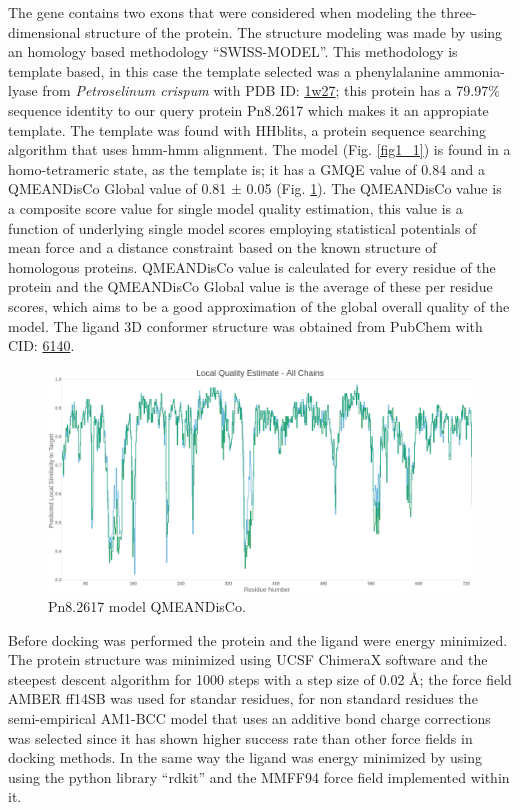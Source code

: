 \documentclass[12pt]{article}
\begin{document}
	The gene contains two exons that were considered when modeling the three-dimensional structure of the protein. The structure modeling was made by using an homology based methodology ``SWISS-MODEL''. \cite{swiss,quaternary_swiss} This methodology is template based, in this case the template selected was a phenylalanine ammonia-lyase from \textit{Petroselinum crispum} with PDB ID: \href{https://www.rcsb.org/structure/1w27}{1w27}; this protein has a 79.97\% sequence identity to our query protein Pn8.2617 which makes it an appropiate template. The template was found with HHblits, a protein sequence searching algorithm that uses hmm-hmm alignment. \cite{hhblits} The model (Fig. \ref{fig1_1}) is found in a homo-tetrameric state, as the template is; it has a GMQE value of 0.84 and a QMEANDisCo Global value of 0.81 ± 0.05 (Fig. \ref{fig1_2}). The QMEANDisCo value is a composite score value for single model quality estimation, this value is a function of underlying single model scores employing statistical potentials of mean force and a distance constraint based on the known structure of homologous proteins. QMEANDisCo value is calculated for every residue of the protein and the QMEANDisCo Global value is the average of these per residue scores, which aims to be a good approximation of the global overall quality of the model. \cite{qmeandisco_swiss} The ligand 3D conformer structure was obtained from PubChem with CID: \href{https://pubchem.ncbi.nlm.nih.gov/compound/6140}{6140}.

	
	\FloatBarrier
	\begin{figure}[h!]
		\centering
		\includegraphics[width=\textwidth-50pt]{../1/Swiss/Local_quality_estimate.png}
		\caption{Pn8.2617 model QMEANDisCo.}
		\label{fig1_2}
	\end{figure}
	\FloatBarrier
	
	Before docking was performed the protein and the ligand were energy minimized. The protein structure was minimized using UCSF ChimeraX software \cite{chimera,chimera_2} and the steepest descent algorithm for 1000 steps with a step size of 0.02 \r{A}; the force field AMBER ff14SB was used for standar residues, for non standard residues the semi-empirical AM1-BCC model that uses an additive bond charge corrections was selected since it has shown higher success rate than other force fields in docking methods. \cite{am1_bcc,am1_bcc_2,am1_bcc_3} In the same way the ligand was energy minimized by using using the python library ``rdkit'' and the MMFF94 force field implemented within it. \cite{rdkit,rdkit_mmff}
	
\end{document}
